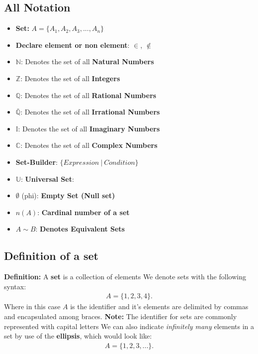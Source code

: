 \documentclass{report}
\begin{document}
      \subsection{All Notation}
      \bigbreak \noindent 
      \begin{itemize}
        \item \textbf{Set:} $A = \{A_{1}, A_{2}, A_{3}, ..., A_{n}\} $  
        \item \textbf{Declare element or non element}: $\in$, $\notin $
        \item \textbf{$\mathbb{N}$}: Denotes the set of all \textbf{Natural Numbers}
        \item $\mathbb{Z}$: Denotes the set of all \textbf{Integers}
        \item $\mathbb{Q}$: Denotes the set of all \textbf{Rational Numbers}
        \item $\mathbb{\bar{Q}}$: Denotes the set of all \textbf{Irrational Numbers}
        \item $\mathbb{I}$: Denotes the set of all \textbf{Imaginary Numbers}
        \item $\mathbb{C}$: Denotes the set of all \textbf{Complex Numbers}
        \item \textbf{Set-Builder}: $\{Expression\ |\ Condition\} $
        \item $\mathbb{U}$: \textbf{Universal Set}: 
        \item $\emptyset$ (phi): \textbf{Empty Set (Null set)}
        \item \textbf{$n(A)$}: \textbf{Cardinal number of a set}
        \item \textbf{$A\sim B$}: \textbf{Denotes Equivalent Sets}
      \end{itemize}
      \pagebreak \bigbreak \noindent 

      \pagebreak \bigbreak \noindent 
      \subsection{Definition of a set}
      \bigbreak \noindent 
        \textbf{Definition:} A \textbf{set} is a collection of elements 
        \smallbreak \noindent
        We denote sets with the following syntax:
        \begin{align*}
            A  = \{1,2,3,4\}
        .\end{align*}
        Where in this case $A$ is the identifier and it's elements are delimited by commas and encapsulated among braces.
        \smallbreak \noindent
        \textbf{Note:} The identifier for sets are commonly represented with capital letters
        \bigbreak \noindent 
        We can also indicate \textit{infinitely many} elements in a set by use of the \textbf{ellipsis}, which would look like:
        \begin{align*}
            A = \{1,2,3,...\}
        .\end{align*}
        \bigbreak \noindent \bigbreak \noindent 
\end{document}

